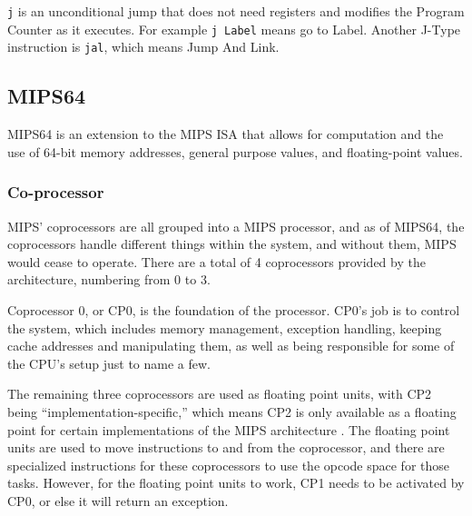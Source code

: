 \documentclass[
    paper=letter,
    parskip=half,
    fontsize=12pt,
    titlepage=firstiscover,
    toc=bibliography,
    numbers=endperiod
]{scrartcl}
\begin{document}
\texttt{j} is an unconditional jump that does not need registers and
modifies the Program Counter as it executes. For example \texttt{j
    Label} means go to Label. Another J-Type instruction is \texttt{jal},
which means Jump And Link.

\subsection{MIPS64}
\label{sec:mips64}

MIPS64 is an extension to the MIPS ISA that allows for computation and
the use of 64-bit memory addresses, general purpose values, and
floating-point values.

\subsubsection{Co-processor}

MIPS' coprocessors are all grouped into a MIPS processor, and as of
MIPS64, the coprocessors handle different things within the system, and
without them, MIPS would cease to operate. There are a total of 4
coprocessors provided by the architecture, numbering from 0 to 3.

Coprocessor 0, or CP0, is the foundation of the processor. CP0's job is
to control the system, which includes memory management, exception
handling, keeping cache addresses and manipulating them, as well as
being responsible for some of the CPU's setup just to name a few.

The remaining three coprocessors are used as floating point units, with
CP2 being ``implementation-specific,'' which means CP2 is only available
as a floating point for certain implementations of the MIPS architecture
\cite[p.~74]{mips-specification}. The floating point units are used to
move instructions to and from the coprocessor, and there are specialized
instructions for these coprocessors to use the opcode space for those
tasks. However, for the floating point units to work, CP1 needs to be
activated by CP0, or else it will return an exception.



\end{document}
